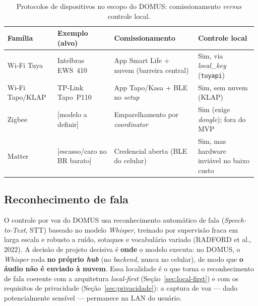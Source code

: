 \begin{table}[H]
  \centering
  \caption{Protocolos de dispositivos no escopo do DOMUS: comissionamento
           \textit{versus} controle local.}
  \label{tab:protocolos}
  \small
  \begin{tabular}{@{}p{2.6cm}p{2.6cm}p{3.4cm}p{3.4cm}@{}}
    \toprule
    \textbf{Família} & \textbf{Exemplo (alvo)} & \textbf{Comissionamento} &
    \textbf{Controle local} \\
    \midrule
    Wi-Fi Tuya      & Intelbras EWS~410 & App Smart Life + nuvem (barreira central) &
      Sim, via \textit{local\_key} (\texttt{tuyapi}) \\
    Wi-Fi Tapo/KLAP & TP-Link Tapo~P110 & App Tapo/Kasa + BLE no \textit{setup} &
      Sim, sem nuvem (KLAP) \\
    Zigbee          & [modelo a definir] & Emparelhamento por \textit{coordinator} &
      Sim (exige \textit{dongle}); fora do MVP \\
    Matter          & [escasso/caro no BR barato] & Credencial aberta (BLE do
      celular) & Sim, mas hardware inviável no baixo custo \\
    \bottomrule
  \end{tabular}
\end{table}


\subsection{Reconhecimento de fala}\label{sec:fala}

O controle por voz do DOMUS usa reconhecimento automático de fala (\textit{Speech-to-Text},
STT) baseado no modelo \textit{Whisper}, treinado por supervisão fraca em larga
escala e robusto a ruído, sotaques e vocabulário variado (RADFORD et al., 2022).
A decisão de projeto decisiva é \textbf{onde} o modelo executa: no DOMUS, o
\textit{Whisper} roda \textbf{no próprio \textit{hub}} (no \textit{backend}, nunca
no celular), de modo que \textbf{o áudio não é enviado à nuvem}. Essa localidade é o
que torna o reconhecimento de fala coerente com a arquitetura \textit{local-first}
(Seção~\ref{sec:local-first}) e com os requisitos de privacidade
(Seção~\ref{sec:privacidade}): a captura de voz --- dado potencialmente sensível ---
permanece na LAN do usuário.

